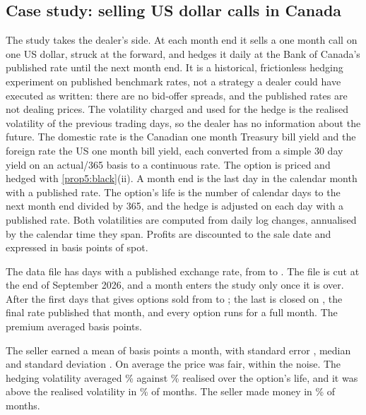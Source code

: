 \begin{chapterrefs}
\section{Case study: selling US dollar calls in Canada}
\label{sec5:case}

The study takes the dealer's side. At each month end it sells a one month call on one US dollar, struck
at the forward, and hedges it daily at the Bank of Canada's published rate until the next month end.
It is a historical, frictionless hedging experiment on published benchmark rates, not a strategy a
dealer could have executed as written: there are no bid-offer spreads, and the published rates are
not dealing prices. The
volatility charged and used for the hedge is the realised volatility of the previous \fxWindow{} trading days,
so the dealer has no information about the future. The domestic rate is the Canadian one month
Treasury bill yield and the foreign rate the US one month bill yield, each converted from a simple
30 day yield on an actual/365 basis to a continuous rate. The option is priced and hedged with
\cref{prop5:black}(ii). A month end is the last day in the calendar month with a published rate. The
option's life is the number of calendar days to the next month end divided by 365, and the hedge is
adjusted on each day with a published rate. Both volatilities are computed from daily log changes,
annualised by the calendar time they span. Profits are discounted to the sale date and expressed in
basis points of spot.

The data file has \fxDays{} days with a published exchange rate, from \fxStart{} to \fxEnd. The file is cut at the end of
September 2026, and a month enters the study only once it is over. After
the first \fxWindow{} days that gives \fxN{} options sold from \fxFirst{} to \fxLast; the last is
closed on \fxLastClose, the final rate published that month, and every option runs for a full
month. The premium averaged \fxPremMean{} basis points.

The seller earned a mean of \fxPnlMean{} basis points a month, with standard error \fxPnlSE, median
\fxPnlMedian{} and standard deviation \fxPnlSd. On average the price was fair, within the noise. The
hedging volatility averaged \fxShMean\% against \fxSrMean\% realised over the option's life, and it was
above the realised volatility in \fxShAbove\% of months. The seller made money in \fxWin\% of months.


\end{chapterrefs}
